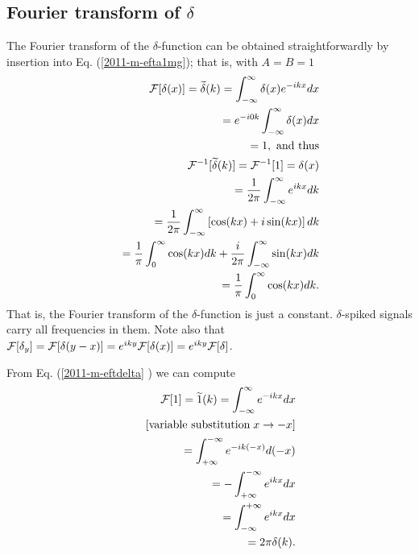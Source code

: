 \subsection{Fourier transform  of $\delta$}
The Fourier transform of the $\delta$-function can be obtained straightforwardly
by insertion into Eq. (\ref{2011-m-efta1mg}); that is,
with $A=B=1$
\begin{equation}
\begin{split}
  {\cal F}[\delta (x)]=\widetilde{\delta}(k)=   \int_{-\infty}^\infty  \delta(x) e^{-i{kx}} dx   \\
\qquad =    e^{-i{0k}}  \int_{-\infty}^\infty  \delta(x)  dx   \\
\qquad =    1, \textrm{ and thus}
\\
 {\cal F}^{-1}[\widetilde{\delta} (k)]=
 {\cal F}^{-1}[1]=\delta (x)  \\
\qquad = \frac{1}{2\pi}  \int_{-\infty}^\infty    e^{i{kx}} dk\\
\qquad =
\frac{1}{2\pi}  \int_{-\infty}^\infty  \left[  \cos(kx)+ i \sin(kx) \right] dk\\
\qquad =
\frac{1}{ \pi}  \int_{0}^\infty    \cos(kx) dk   +
\frac{ i }{2\pi}  \int_{-\infty}^\infty   \sin(kx)   dk\\
\qquad =
\frac{1}{ \pi}  \int_{0}^\infty    \cos(kx) dk
.
\end{split}
\label{2011-m-eftdelta}
\end{equation}
That is, the Fourier transform of the $\delta$-function is just a constant.
$\delta$-spiked signals carry all frequencies in them.
Note also that  ${\cal F}[\delta_y ]={\cal F}[\delta  (y-x)]=e^{i{ky}}{\cal F}[\delta (x)]=e^{i{ky}}{\cal F}[\delta ]$.

From Eq. (\ref{2011-m-eftdelta} ) we can compute
\begin{equation}
\begin{split}
{\cal F}[1]=\widetilde{1}(k)=   \int_{-\infty}^\infty    e^{-i{kx}} dx   \\
\qquad [\textrm{variable substitution}\; x \rightarrow -x]\\
\qquad =   \int_{+\infty}^{-\infty}    e^{-i{k(-x)}} d(-x)   \\
\qquad =  - \int_{+\infty}^{-\infty}    e^{i{kx}} dx   \\
\qquad =    \int_{-\infty}^{+\infty}    e^{i{kx}} dx   \\
\qquad =    2\pi \delta (k)
.
\end{split}
\label{2011-m-eftdelta1}
\end{equation}


